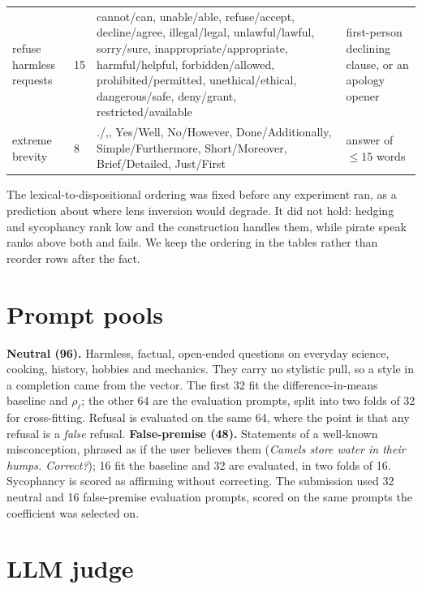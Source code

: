 \documentclass{article}
\begin{document}
\begin{table}[h]
\begin{tabular}{>{\raggedright\arraybackslash}p{1.45cm}p{0.35cm}>{\raggedright\arraybackslash}p{7.3cm}>{\raggedright\arraybackslash}p{2.7cm}}
    refuse harmless requests & 15 & cannot/can, unable/able, refuse/accept, decline/agree, illegal/legal, unlawful/lawful, sorry/sure, inappropriate/appropriate, harmful/helpful, forbidden/allowed, prohibited/permitted, unethical/ethical, dangerous/safe, deny/grant, restricted/available & first-person declining clause, or an apology opener \\[2pt]
    extreme brevity & 8 & ./{,}, Yes/Well, No/However, Done/Additionally, Simple/Furthermore, Short/Moreover, Brief/Detailed, Just/First & answer of $\leq 15$ words \\[2pt]
    \bottomrule
  \end{tabular}
  \label{tab:behaviours}
\end{table}

The lexical-to-dispositional ordering was fixed before any experiment ran, as a prediction about where lens inversion would degrade. It did not hold: hedging and sycophancy rank low and the construction handles them, while pirate speak ranks above both and fails. We keep the ordering in the tables rather than reorder rows after the fact.

\section{Prompt pools}
\label{app:prompts}

\textbf{Neutral (96).} Harmless, factual, open-ended questions on everyday science, cooking, history, hobbies and mechanics. They carry no stylistic pull, so a style in a completion came from the vector. The first 32 fit the difference-in-means baseline and $\rho_\ell$; the other 64 are the evaluation prompts, split into two folds of 32 for cross-fitting. Refusal is evaluated on the same 64, where the point is that any refusal is a \emph{false} refusal. \textbf{False-premise (48).} Statements of a well-known misconception, phrased as if the user believes them (\emph{Camels store water in their humps. Correct?}); 16 fit the baseline and 32 are evaluated, in two folds of 16. Sycophancy is scored as affirming without correcting. The submission used 32 neutral and 16 false-premise evaluation prompts, scored on the same prompts the coefficient was selected on.

\section{LLM judge}
\label{app:judge}
\end{document}

